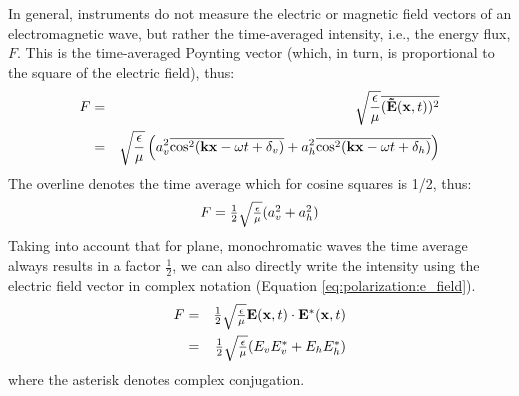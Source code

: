 In general, instruments do not measure the electric or magnetic field
vectors of an electromagnetic wave, but rather the time-averaged
intensity, i.e., the energy flux, $F$. This is the time-averaged Poynting
vector (which, in turn, is proportional to the square of the electric
field), thus:
\begin{eqnarray}
  F 
  &=& 
  \sqrt{\frac{\epsilon}{\mu}}\overline{(\mathbf{\tilde{E}}(\mathbf{x},t))^2}\\
   \nonumber
  &=&
  \sqrt{\frac{\epsilon}{\mu}}\left(
    a_v^2\overline{\cos^2(\mathbf{k}\mathbf{x} - \omega t + \delta_v)}
    + a_h^2\overline{\cos^2(\mathbf{k}\mathbf{x} - \omega t + \delta_h)}
   \right)
  \label{eq:polarization:intensity}
\end{eqnarray}
The overline denotes the time average
which for cosine squares is 1/2, thus:
\begin{equation}
  \label{eq:polarization:intensity2}
 F = 
  \textstyle\frac{1}{2}\sqrt{\frac{\epsilon}{\mu}}(
    a_v^2 + a_h^2)  
\end{equation}
Taking into account that for plane, monochromatic waves 
the time average always results in a factor
$\frac{1}{2}$, we can also directly write the intensity using the
electric field vector in complex notation
(Equation \ref{eq:polarization:e_field}).
\begin{eqnarray}
  \label{eq:polarization:intensity_from_complex}
  F &=&  \textstyle\frac{1}{2}\sqrt{\frac{\epsilon}{\mu}} \mathbf{E} (\mathbf{x},t) 
          \cdot \mathbf{E}^\ast (\mathbf{x},t)\\ \nonumber
    &=&   \textstyle\frac{1}{2}\sqrt{\frac{\epsilon}{\mu}}
          (E_v E_v^\ast + E_h E_h^\ast)
\end{eqnarray}
where the asterisk denotes complex conjugation.%

